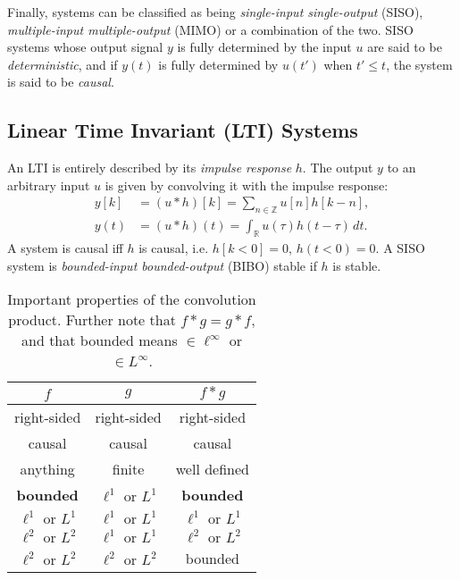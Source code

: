 Finally, systems can be classified as being \emph{single-input single-output}
(SISO), \emph{multiple-input multiple-output} (MIMO) or a combination of the
two. SISO systems whose output signal $y$ is fully determined by the
input $u$ are said to be \emph{deterministic}, and if $y(t)$ is fully determined
by $u(t')$ when $t' \leq t$, the system is said to be \emph{causal}.

\subsection{Linear Time Invariant (LTI) Systems}

An LTI is entirely described by its \emph{impulse response} $h$. The output
$y$ to an arbitrary input $u$ is given by convolving it with the impulse
response:
\begin{align*}
	y[k] &= (u * h)[k] = \sum_{n\in\mathbb{Z}} u[n] h[k - n], \\
	y(t) &= (u * h)(t) = \int_\mathbb{R} u(\tau) h(t - \tau) \, dt.
\end{align*}
A system is causal iff $h$ is causal, i.e. $h[k < 0] = 0$, $h(t < 0) = 0$. A
SISO system is \emph{bounded-input bounded-output} (BIBO) stable if $h$ is
stable.

\begin{table}
	\centering
	\begin{tabular}{ccc}
		\toprule
		$f$ & $g$ & $f * g$ \\
		\midrule
		right-sided & right-sided & right-sided  \\
		causal      & causal      & causal       \\
		anything    & finite      & well defined \\
		\midrule
		\bfseries bounded
			& $\ell^1\text{ or }L^1$
			& \bfseries bounded \\
		$\ell^1\text{ or }L^1$
			& $\ell^1\text{ or }L^1$
			& $\ell^1\text{ or }L^1$ \\
		\midrule
		$\ell^2\text{ or }L^2$
			& $\ell^1\text{ or }L^1$
			& $\ell^2\text{ or }L^2$ \\
		$\ell^2\text{ or }L^2$
			& $\ell^2\text{ or }L^2$
			& bounded \\
		\bottomrule
	\end{tabular}
	\caption{
		Important properties of the convolution product. Further note that $f * g
		= g * f$, and that bounded means $\in \ell^\infty$ or $\in L^\infty$.
	}
\end{table}
